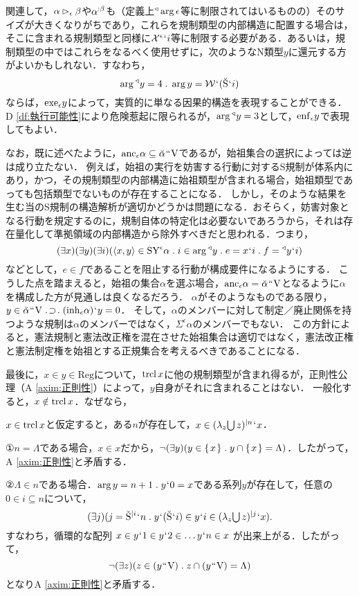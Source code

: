 関連して，$\alpha\mathbin{\vartriangleright_{\epsilon}}\beta$や$\alpha^{:\beta}$も（定義上${^\triangleleft}\arg\epsilon$等に制限されてはいるものの）そのサイズが大きくなりがちであり，これらを規制類型の内部構造に配置する場合は，そこに含まれる規制類型と同様に$ \mathcal{X}^\epsilon{\mspace{1mu}{`}\mspace{1mu}} i $等に制限する必要がある．あるいは，規制類型の中ではこれらをなるべく使用せずに，次のようなN類型$y$に還元する方がよいかもしれない．すなわち，
\[
   \arg\trgl{y} = 4\con{1}\arg y = \mathcal{W}\fap(\breve{\mathrm{S}}\fap i)
\]
ならば，$ \mathrm{exe}_{\epsilon}y $によって，実質的に単なる因果的構造を表現することができる．D \ref{df:執行可能性}により危険惹起に限られるが，$ \arg{^\triangleleft}y = 3 $として，$\mathrm{enf}_{\epsilon} y$で表現してもよい．

なお，既に述べたように，$\mathrm{anc}_\epsilon\alpha\subseteq\breve{\alpha}{\mspace{1mu}{``}\mspace{1mu}}\mathrm{V}$であるが，始祖集合の選択によっては逆は成り立たない．
例えば，始祖の実行を妨害する行動に対するS規制が体系内にあり，かつ，その規制類型の内部構造に始祖類型が含まれる場合，始祖類型であっても包括類型でないものが存在することになる．
しかし，そのような結果を生む当のS規制の構造解析が適切かどうかは問題になる．おそらく，妨害対象となる行動を規定するのに，規制自体の特定化は必要ないであろうから，それは存在量化して準拠領域の内部構造から除外すべきだと思われる．つまり，
\[
    (\exists x)(\exists y)(\exists i)(\orp{x,y}\in \mathrm{SY}^{\epsilon}\alpha\con{1}i\in\arg \trgl{y}\con{1}
    e = x\fap i\con{1}f = \trgl{y}\fap i)
\]
などとして，$ e\in f $であることを阻止する行動が構成要件になるようにする．
こうした点を踏まえると，始祖の集合$\alpha$を選ぶ場合，$ \mathrm{anc}_\epsilon\alpha = \breve{\alpha}{\mspace{1mu}{``}\mspace{1mu}}\mathrm{V} $となるように$\alpha$を構成した方が見通しは良くなるだろう．
$\alpha$がそのようなものである限り，$ y\in\breve{\alpha}\img\univ\case{1}{1}{1}(\mathrm{inh}_\epsilon\alpha)\fap y = 0 $．
そして，$ \alpha $のメンバーに対して制定／廃止関係を持つような規制は$ \alpha $のメンバーではなく，$ \varSigma^{\epsilon}\alpha $のメンバーでもない．
この方針によると，憲法規制と憲法改正権を混在させた始祖集合は適切ではなく，憲法改正権と憲法制定権を始祖とする正規集合を考えるべきであることになる．

最後に，$ x\in y\in\mathrm{Reg} $について，$ \operatorname{trcl} x $に他の規制類型が含まれ得るが，正則性公理（A \ref{axim:正則性}）によって，$y$自身がそれに含まれることはない．
一般化すると，$ x\notin\operatorname{trcl} x $．なぜなら，
\begin{pfx}
$ x\in\operatorname{trcl} x $と仮定すると，ある$n$が存在して，$ x\in (\lambda_z{\textstyle\bigcup}\mspace{3mu}z)^{\mid n}{\mspace{1mu}{`}\mspace{1mu}} x $．

①$n=\Lambda$である場合，$x\in x$だから，$\neg(\exists y)(y\in\classab{x}\con{1}y\cap\classab{x}=\Lambda)$．したがって，A \ref{axim:正則性}と矛盾する．

②$ \Lambda\in n $である場合．$\arg y = n+1\con{1}y\fap 0 = x $である系列$y$が存在して，任意の$ 0\in i\subseteq n $について，
\[
    (\exists j)(
        j = \iter{\breve{\mathrm{S}}}{i}\fap n\con{1}
        y\fap(\breve{\mathrm{S}}\fap i)\in y\fap i \in \iter{(\lambda_z\union{z})}{j}\fap x
    ).
\]
すなわち，循環的な配列 $ x\in y{\mspace{1mu}{`}\mspace{1mu}} 1\in y{\mspace{1mu}{`}\mspace{1mu}} 2 \in \dots y{\mspace{1mu}{`}\mspace{1mu}} n\in x $ が出来上がる．したがって，
\[
    \neg(\exists z)(z\in(y\img\univ)\con{1}z\cap(y\img\univ)=\Lambda)
\]
となりA \ref{axim:正則性}と矛盾する．
\end{pfx}

